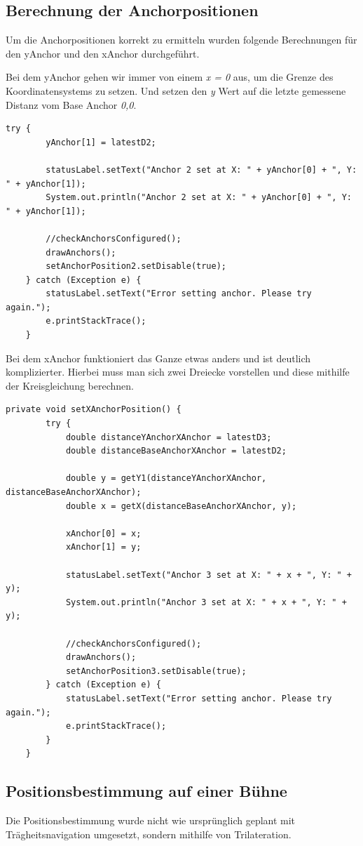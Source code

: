 \subsection{Berechnung der Anchorpositionen}
Um die Anchorpositionen korrekt zu ermitteln wurden folgende Berechnungen für den yAnchor und den xAnchor durchgeführt.

Bei dem yAnchor gehen wir immer von einem \textit{x = 0} aus, um die Grenze des Koordinatensystems zu setzen. Und setzen den \textit{y} Wert auf die letzte gemessene Distanz vom Base Anchor \textit{0,0}.
\begin{lstlisting}[style=Java, caption=Berechnung yAnchor, captionpos=b]
	try {
		yAnchor[1] = latestD2;
		
		statusLabel.setText("Anchor 2 set at X: " + yAnchor[0] + ", Y: " + yAnchor[1]);
		System.out.println("Anchor 2 set at X: " + yAnchor[0] + ", Y: " + yAnchor[1]);
		
		//checkAnchorsConfigured();
		drawAnchors();
		setAnchorPosition2.setDisable(true);
	} catch (Exception e) {
		statusLabel.setText("Error setting anchor. Please try again.");
		e.printStackTrace();
	}
\end{lstlisting}

\newpage
Bei dem xAnchor funktioniert das Ganze etwas anders und ist deutlich komplizierter. Hierbei muss man sich zwei Dreiecke vorstellen und diese mithilfe der Kreisgleichung berechnen.
\begin{lstlisting}[style=Java, caption=Berechnung xAnchor, captionpos=b]
	private void setXAnchorPosition() {
		try {
			double distanceYAnchorXAnchor = latestD3;
			double distanceBaseAnchorXAnchor = latestD2;
			
			double y = getY1(distanceYAnchorXAnchor, distanceBaseAnchorXAnchor);
			double x = getX(distanceBaseAnchorXAnchor, y);
			
			xAnchor[0] = x;
			xAnchor[1] = y;
			
			statusLabel.setText("Anchor 3 set at X: " + x + ", Y: " + y);
			System.out.println("Anchor 3 set at X: " + x + ", Y: " + y);
			
			//checkAnchorsConfigured();
			drawAnchors();
			setAnchorPosition3.setDisable(true);
		} catch (Exception e) {
			statusLabel.setText("Error setting anchor. Please try again.");
			e.printStackTrace();
		}
	}
\end{lstlisting}


\newpage
\subsection{Positionsbestimmung auf einer Bühne}
Die Positionsbestimmung wurde nicht wie ursprünglich geplant mit Trägheitsnavigation umgesetzt, sondern mithilfe von Trilateration. 

